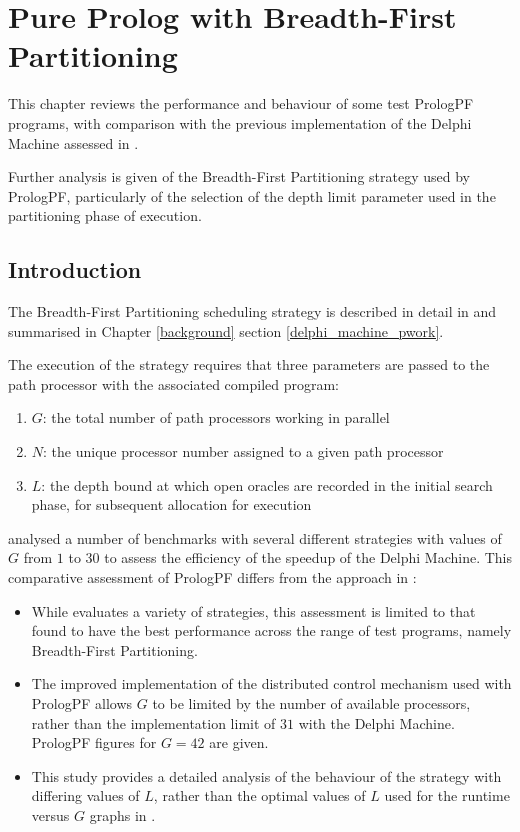 \chapter{Pure Prolog with Breadth-First Partitioning} 
\label{bfp_depth}


This chapter reviews the performance and behaviour of
some test PrologPF programs, with comparison with the previous
implementation of the Delphi Machine assessed in \cite{Sar95}.

Further analysis is given of the Breadth-First Partitioning strategy used
by PrologPF, particularly of the selection of the depth limit parameter used
in the partitioning phase of execution.

\section{Introduction} %

The Breadth-First Partitioning scheduling strategy is described in detail in
\cite{Sar95} and summarised in Chapter \ref{background} section
\ref{delphi_machine_pwork}.

The execution of the strategy requires that three parameters
are passed to the path processor
with the associated compiled program:
\begin{enumerate}
\item{$G$: the total number of path processors working in parallel}
\item{$N$: the unique processor number assigned to a given path processor}
\item{$L$: the depth bound at which open oracles are recorded in the
  initial search phase, for subsequent allocation for execution}
\end{enumerate}

\cite{Sar95} analysed a number of benchmarks with several different
strategies with values of $G$ from $1$ to
$30$ to assess the efficiency of the speedup of the Delphi Machine.
This comparative assessment of PrologPF differs from the approach in
\cite{Sar95}:
\begin{itemize}
\item{While \cite{Sar95} evaluates a variety of strategies, this assessment
  is limited to that found to have the best performance across the range of
  test programs, namely Breadth-First Partitioning.}
\item{The improved implementation of the distributed control mechanism used
  with PrologPF allows $G$ to be limited by the number of available processors,
  rather than the implementation limit of $31$ with the Delphi Machine.
  PrologPF figures for $G = 42$ are given.}
\item{This study provides a detailed analysis of the behaviour of the strategy
  with differing values of $L$, rather than the optimal values of $L$ used
  for the runtime versus $G$ graphs in \cite{Sar95}.}
\end{itemize}

